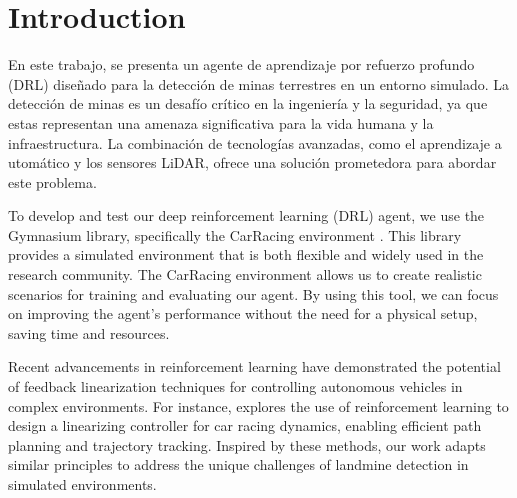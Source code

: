 \section{Introduction}
En este trabajo, se presenta un agente de aprendizaje por refuerzo 
profundo (DRL) diseñado para la detección de minas terrestres en un 
entorno simulado. La detección de minas es un desafío crítico en la 
ingeniería y la seguridad, ya que estas representan una amenaza 
significativa para la vida humana y la infraestructura. 
La combinación de tecnologías avanzadas, como el aprendizaje a
utomático y los sensores LiDAR, ofrece una solución prometedora 
para abordar este problema.

To develop and test our deep reinforcement learning (DRL) agent, we use the Gymnasium library, specifically the CarRacing environment \cite{gymnasium2023}. This library provides a simulated environment that is both flexible and widely used in the research community. The CarRacing environment allows us to create realistic scenarios for training and evaluating our agent. By using this tool, we can focus on improving the agent's performance without the need for a physical setup, saving time and resources.

Recent advancements in reinforcement learning have demonstrated the potential of feedback linearization techniques for controlling autonomous vehicles in complex environments. For instance, \cite{feedback_linearization2021} explores the use of reinforcement learning to design a linearizing controller for car racing dynamics, enabling efficient path planning and trajectory tracking. Inspired by these methods, our work adapts similar principles to address the unique challenges of landmine detection in simulated environments.




